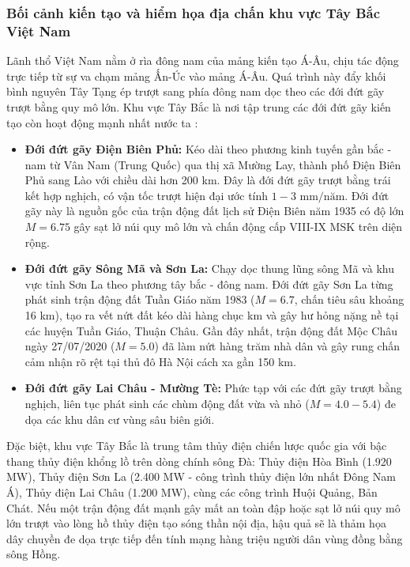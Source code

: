 \documentclass[preprint,1p]{elsarticle}
\begin{document}
\subsubsection{Bối cảnh kiến tạo và hiểm họa địa chấn khu vực Tây Bắc Việt Nam}
Lãnh thổ Việt Nam nằm ở rìa đông nam của mảng kiến tạo Á-Âu, chịu tác động trực tiếp từ sự va chạm mảng Ấn-Úc vào mảng Á-Âu. Quá trình này đẩy khối bình nguyên Tây Tạng ép trượt sang phía đông nam dọc theo các đới đứt gãy trượt bằng quy mô lớn. Khu vực Tây Bắc là nơi tập trung các đới đứt gãy kiến tạo còn hoạt động mạnh nhất nước ta \cite{nguyen2020seismic}:
\begin{itemize}
    \item \textbf{Đới đứt gãy Điện Biên Phủ:} Kéo dài theo phương kinh tuyến gần bắc - nam từ Vân Nam (Trung Quốc) qua thị xã Mường Lay, thành phố Điện Biên Phủ sang Lào với chiều dài hơn 200 km. Đây là đới đứt gãy trượt bằng trái kết hợp nghịch, có vận tốc trượt hiện đại ước tính $1 - 3\text{ mm/năm}$. Đới đứt gãy này là nguồn gốc của trận động đất lịch sử Điện Biên năm 1935 có độ lớn $M = 6.75$ gây sạt lở núi quy mô lớn và chấn động cấp VIII-IX MSK trên diện rộng.
    \item \textbf{Đới đứt gãy Sông Mã và Sơn La:} Chạy dọc thung lũng sông Mã và khu vực tỉnh Sơn La theo phương tây bắc - đông nam. Đới đứt gãy Sơn La từng phát sinh trận động đất Tuần Giáo năm 1983 ($M = 6.7$, chấn tiêu sâu khoảng 16 km), tạo ra vết nứt đất kéo dài hàng chục km và gây hư hỏng nặng nề tại các huyện Tuần Giáo, Thuận Châu. Gần đây nhất, trận động đất Mộc Châu ngày 27/07/2020 ($M = 5.0$) đã làm nứt hàng trăm nhà dân và gây rung chấn cảm nhận rõ rệt tại thủ đô Hà Nội cách xa gần 150 km.
    \item \textbf{Đới đứt gãy Lai Châu - Mường Tè:} Phức tạp với các đứt gãy trượt bằng nghịch, liên tục phát sinh các chùm động đất vừa và nhỏ ($M = 4.0 - 5.4$) đe dọa các khu dân cư vùng sâu biên giới.
\end{itemize}

Đặc biệt, khu vực Tây Bắc là trung tâm thủy điện chiến lược quốc gia với bậc thang thủy điện khổng lồ trên dòng chính sông Đà: Thủy điện Hòa Bình (1.920 MW), Thủy điện Sơn La (2.400 MW - công trình thủy điện lớn nhất Đông Nam Á), Thủy điện Lai Châu (1.200 MW), cùng các công trình Huội Quảng, Bản Chát. Nếu một trận động đất mạnh gây mất an toàn đập hoặc sạt lở núi quy mô lớn trượt vào lòng hồ thủy điện tạo sóng thần nội địa, hậu quả sẽ là thảm họa dây chuyền đe dọa trực tiếp đến tính mạng hàng triệu người dân vùng đồng bằng sông Hồng.
\end{document}
